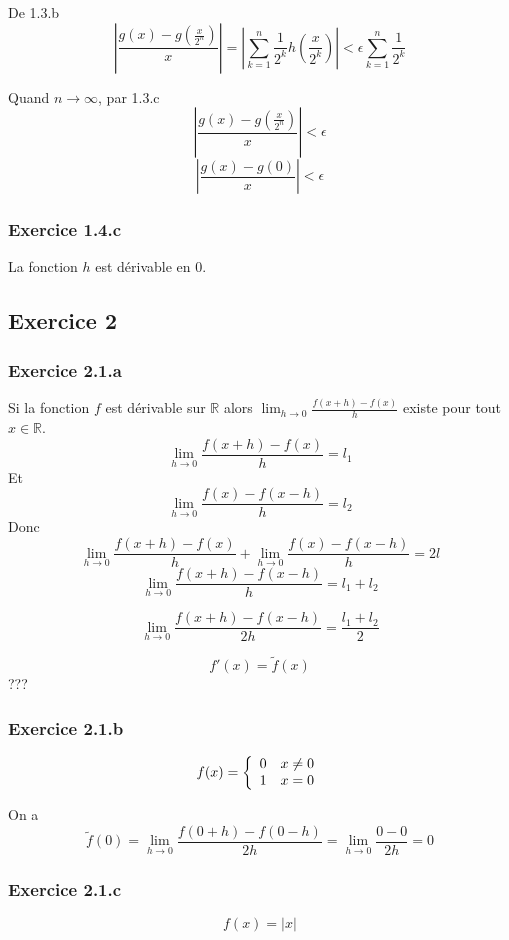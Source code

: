 \documentclass[]{book}
\theoremstyle{definition}
\newcommand{\bb}[1]{\mathbb{#1}}
\newcommand{\R}{\bb{R}}
\begin{document}
De 1.3.b
$$\left| \frac{g(x) - g(\frac{x}{2^n})}{x} \right| = \left| \sum_{k=1}^{n} {\frac{1}{2^k}h\left(\frac{x}{2^k}\right)} \right|  < \epsilon \sum_{k=1}^{n}{\frac{1}{2^k}}$$

Quand $n \to \infty$, par 1.3.c
$$\left| \frac{g(x) - g(\frac{x}{2^n})}{x} \right| < \epsilon $$
$$\left| \frac{g(x) - g(0)}{x} \right| < \epsilon $$

\subsubsection*{Exercice 1.4.c}
La fonction $h$ est d\'erivable en 0.\\

\subsection*{Exercice 2}
\subsubsection*{Exercice 2.1.a}
Si la  fonction $f$ est d\'erivable sur $\R$ alors $\lim_{h \to 0} \frac{f(x+h) - f(x)}{h}$ existe pour tout $x \in \R$. \\
$$\lim_{h \to 0} \frac{f(x+h) - f(x)}{h} = l_1$$
Et
$$\lim_{h \to 0} \frac{f(x) - f(x-h)}{h} = l_2$$
Donc
$$\lim_{h \to 0} \frac{f(x+h) - f(x)}{h} + \lim_{h \to 0} \frac{f(x) - f(x-h)}{h} = 2l$$
$$\lim_{h \to 0} \frac{f(x+h) - f(x-h)}{h} = l_1 + l_2$$

$$\lim_{h \to 0} \frac{f(x+h) - f(x-h)}{2h} = \frac{l_1 + l_2}{2}$$

$$f'(x) = \tilde{f}(x)$$
???


\subsubsection*{Exercice 2.1.b}
$$
f(x) = \left\{ 
\begin{array}{l l}
0 & x \neq 0 \\
1 & x = 0 \\
\end{array}
\right.
$$

On a 
$$\tilde{f}(0)= \lim_{h \to 0} \frac{f(0+h)-f(0-h)}{2h} = \lim_{h \to 0} \frac{0 - 0}{2h} = 0$$

\subsubsection*{Exercice 2.1.c}
$$f(x) = |x|$$
\end{document}
